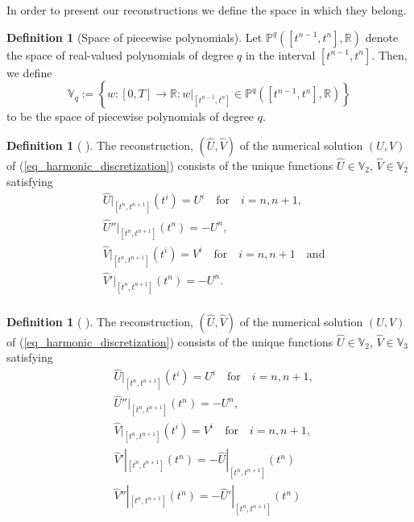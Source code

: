 \documentclass[12pt,a4paper]{article}
\numberwithin{equation}{section}
\theoremstyle{definition}
\newcommand{\polygs}[3]{\mathbb{P}^{#1}\qp{#2,#3}}
\newcommand{\qp}[1]{\left(#1\right)}
\newcommand{\qb}[1]{\left[#1\right]}
\newcommand{\rec}[1]{\widehat{{#1}}}
\newcommand{\bracegs}[1]{\left\lbrace#1\right\rbrace}
\newtheorem{Defn}[subsection]{Definition}
\begin{document}
 In order to present our reconstructions we  define the space in which they belong. 
  \begin{Defn}[Space of piecewise polynomials]\label{defn_space_pwpoly}
 	Let $\polygs{q}{\qb{t^{n-1},t^n}}{\mathbb{R}}$ denote the space of real-valued polynomials of degree $q$ in the interval $\qb{t^{n-1}, t^n}$.  Then, we define 
 	\begin{equation}
 	\mathbb{V}_q:=\bracegs{w:\qb{0,T}\rightarrow\mathbb{R}: w|_{\qb{t^{n-1},t^n}}\in \polygs{q}{\qb{t^{n-1},t^n}}{\mathbb{R}}}
 	\end{equation}
 	to be the space of piecewise polynomials of degree $q$.
 \end{Defn}
 
\begin{Defn}[ ]\label{defn_our_rec}
	The reconstruction, $\qp{\rec{U},\rec{V}}$ of the numerical solution $\qp{U,V}$ of (\ref{eq_harmonic_discretization}) consists of the unique functions $\rec{U}\in \mathbb{V}_2$, $\rec{V}\in\mathbb{V}_2$ satisfying
	\begin{equation}
	\begin{aligned}
	&\rec{U}|_{\qb{t^n,t^{n+1}}}\qp{t^i}=U^i \quad \text{for}\quad i= n, n+1,\\
	&\rec{U}''|_{\qb{t^n,t^{n+1}}}\qp{t^n}=-U^n,\\
	&	\rec{V}|_{\qb{t^n,t^{n+1}}}\qp{t^{i}}=V^{i}\quad \text{for}\quad i= n, n+1\quad\text{and}\\
	&	\rec{V}'|_{\qb{t^n,t^{n+1}}}\qp{t^n}=-U^n.\\
	\end{aligned}
	\end{equation}
\end{Defn}
\begin{Defn}[ ]\label{defn_our_rec2}
	The reconstruction, $\qp{\rec{U},\rec{V}}$ of the numerical solution $\qp{U,V}$ of (\ref{eq_harmonic_discretization}) consists of the unique functions $\rec{U}\in \mathbb{V}_2$, $\rec{V}\in\mathbb{V}_3$ satisfying
	\begin{equation}\label{eq_rec2_conds}
	\begin{aligned}
	&\rec{U}|_{\qb{t^n,t^{n+1}}}\qp{t^i}=U^i \quad \text{for}\quad i= n, n+1,\\
	&\rec{U}''|_{\qb{t^n,t^{n+1}}}\qp{t^n}=-U^n,\\
     &\rec{V}|_{\qb{t^n,t^{n+1}}}\qp{t^i}=V^i \quad \text{for}\quad i= n, n+1,\\
      &\rec{V}'|_{\qb{t^n,t^{n+1}}}\qp{t^n}=-\rec{U}|_{\qb{t^n,t^{n+1}}}\qp{t^n}\\
            &\rec{V}''|_{\qb{t^n,t^{n+1}}}\qp{t^n}=-\rec{U}'|_{\qb{t^n,t^{n+1}}}\qp{t^n}\\
	\end{aligned}
	\end{equation}
\end{Defn}
\end{document}
